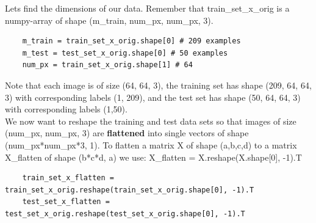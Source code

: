 \documentclass[11pt, a4paper]{article}
\begin{document}
\begin{spacing}{1.1}
	\noindent Lets find the dimensions of our data. Remember that train\_set\_x\_orig is a numpy-array of shape (m\_train, num\_px, num\_px, 3). 
	\begin{lstlisting}
	m_train = train_set_x_orig.shape[0] # 209 examples
	m_test = test_set_x_orig.shape[0] # 50 examples
	num_px = train_set_x_orig.shape[1] # 64 \end{lstlisting} \vspace*{1mm} 
	Note that each image is of size (64, 64, 3), the training set has shape (209, 64, 64, 3) with corresponding labels (1, 209), and the test set has shape (50, 64, 64, 3) with corresponding labels (1,50). \vspace*{2mm} \\
	We now want to reshape the training and test data sets so that images of size (num\_px, num\_px, 3) are \textbf{flattened} into single vectors of shape (num\_px*num\_px*3, 1). To flatten a matrix X of shape (a,b,c,d) to a matrix X\_flatten of shape (b*c*d, a) we use: X\_flatten = X.reshape(X.shape[0], -1).T
	\begin{lstlisting}
	train_set_x_flatten = train_set_x_orig.reshape(train_set_x_orig.shape[0], -1).T
	test_set_x_flatten = test_set_x_orig.reshape(test_set_x_orig.shape[0], -1).T 
	

\end{lstlisting}
\end{spacing}
\end{document}
